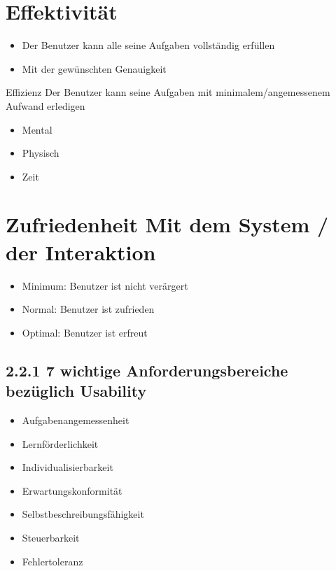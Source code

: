 \documentclass[10pt]{article}
\begin{document}
\section*{Effektivität}
\begin{itemize}
  \item Der Benutzer kann alle seine Aufgaben vollständig erfüllen
  \item Mit der gewünschten Genauigkeit
\end{itemize}

Effizienz Der Benutzer kann seine Aufgaben mit minimalem/angemessenem Aufwand erledigen

\begin{itemize}
  \item Mental
  \item Physisch
  \item Zeit
\end{itemize}

\section*{Zufriedenheit Mit dem System / der Interaktion}
\begin{itemize}
  \item Minimum: Benutzer ist nicht verärgert
  \item Normal: Benutzer ist zufrieden
  \item Optimal: Benutzer ist erfreut
\end{itemize}

\subsection*{2.2.1 7 wichtige Anforderungsbereiche bezüglich Usability}
\begin{itemize}
  \item Aufgabenangemessenheit
  \item Lernförderlichkeit
  \item Individualisierbarkeit
  \item Erwartungskonformität
  \item Selbstbeschreibungsfähigkeit
  \item Steuerbarkeit
  \item Fehlertoleranz
\end{itemize}
\end{document}
